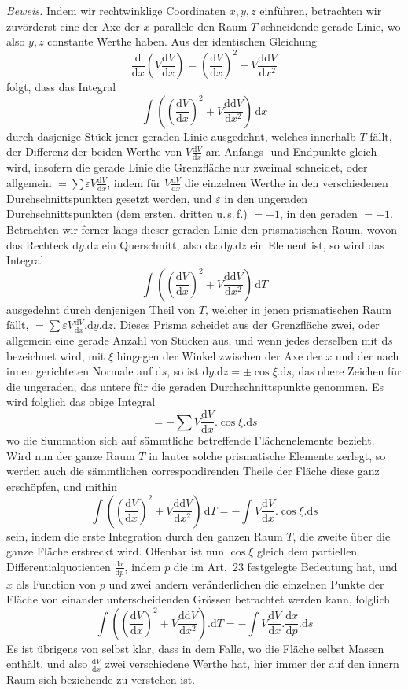 \textit{Beweis.} Indem wir rechtwinklige Coordinaten $x,y,z$ einführen, betrachten wir zuvörderst eine der Axe der $x$ parallele den Raum $T$ schneidende gerade Linie, wo also $y,z$ constante Werthe haben. Aus der identischen Gleichung
\[
\frac{\mathrm d}{\mathrm dx}(V\frac{\mathrm dV}{\mathrm dx})=(\frac{\mathrm dV}{\mathrm dx})^2+V\frac{\mathrm d\mathrm dV}{\mathrm dx^2}
\]
folgt, dass das Integral
\[
\int((\frac{\mathrm dV}{\mathrm dx})^2+V\frac{\mathrm d\mathrm dV}{\mathrm dx^2})\,\mathrm dx
\]
durch dasjenige Stück jener geraden Linie ausgedehnt, welches innerhalb $T$ fällt, der Differenz der beiden Werthe von $V\frac{\mathrm dV}{\mathrm dx}$ am Anfangs- und Endpunkte gleich wird, insofern die gerade Linie die Grenzfläche nur zweimal schneidet, oder allgemein $=\sum\varepsilon V\frac{\mathrm dV}{\mathrm dx}$, indem für $V\frac{\mathrm dV}{\mathrm dx}$ die einzelnen Werthe in den verschiedenen Durchschnittspunkten gesetzt werden, und $\varepsilon$ in den ungeraden Durchschnittspunkten (dem ersten, dritten u.\,s.\,f.) $=-1$, in den geraden $=+1$. Betrachten wir ferner längs dieser geraden Linie den prismatischen Raum, wovon das Rechteck $\mathrm dy.\mathrm dz$ ein Querschnitt, also $\mathrm dx.\mathrm dy.\mathrm dz$ ein Element ist, so wird das Integral
\[
\int((\frac{\mathrm dV}{\mathrm dx})^2+V\frac{\mathrm d\mathrm dV}{\mathrm dx^2})\,\mathrm dT
\]
ausgedehnt durch denjenigen Theil von $T$, welcher in jenen prismatischen Raum fällt, $=\sum\varepsilon V\frac{\mathrm dV}{\mathrm dx}.\mathrm dy.\mathrm dz$. Dieses Prisma scheidet aus der Grenzfläche zwei, oder allgemein eine gerade Anzahl von Stücken aus, und wenn jedes derselben mit $\mathrm ds$ bezeichnet wird, mit $\xi$ hingegen der Winkel zwischen der Axe der $x$ und der nach innen gerichteten Normale auf $\mathrm ds$, so ist $\mathrm dy.\mathrm dz=\pm\cos\xi.\mathrm ds$, das obere Zeichen für die ungeraden, das untere für die geraden Durchschnittspunkte genommen. Es wird folglich das obige Integral
\[
=-\sum V\frac{\mathrm dV}{\mathrm dx}.\cos\xi.\mathrm ds
\]
wo die Summation sich auf sämmtliche betreffende Flächenelemente bezieht. Wird nun der ganze Raum $T$ in lauter solche prismatische Elemente zerlegt, so werden auch die sämmtlichen correspondirenden Theile der Fläche diese ganz erschöpfen, und mithin
\[
\int((\frac{\mathrm dV}{\mathrm dx})^2+V\frac{\mathrm d\mathrm dV}{\mathrm dx^2})\,\mathrm dT=-\int V\frac{\mathrm dV}{\mathrm dx}.\cos\xi.\mathrm ds
\]
sein, indem die erste Integration durch den ganzen Raum $T$, die zweite über die ganze Fläche erstreckt wird. Offenbar ist nun $\cos\xi$ gleich dem partiellen Differentialquotienten $\frac{\mathrm dx}{\mathrm dp}$, indem $p$ die im Art.\ 23 festgelegte Bedeutung hat, und $x$ als Function von $p$ und zwei andern veränderlichen die einzelnen Punkte der Fläche von einander unterscheidenden Grössen betrachtet werden kann, folglich
\[
\int((\frac{\mathrm dV}{\mathrm dx})^2+V\frac{\mathrm d\mathrm dV}{\mathrm dx^2}).\mathrm dT=-\int V\frac{\mathrm dV}{\mathrm dx}.\frac{\mathrm dx}{\mathrm dp}.\mathrm ds
\]
Es ist übrigens von selbst klar, dass in dem Falle, wo die Fläche selbst Massen enthält, und also $\frac{\mathrm dV}{\mathrm dx}$ zwei verschiedene Werthe hat, hier immer der auf den innern Raum sich beziehende zu verstehen ist.

